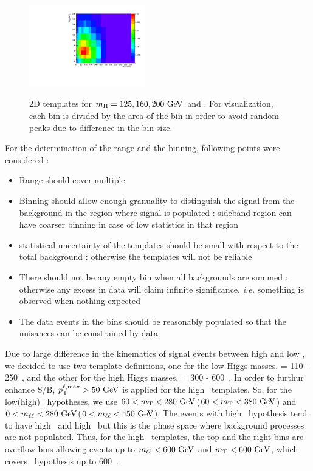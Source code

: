 \begin{figure}[htp]
{\centering
\label{subfig:2dNormBin_qqWW}
\includegraphics[width=0.45\textwidth]{figures/2dNormBin_qqWW.pdf}
}
\caption{ 2D templates for $m_{\mathrm{H}}=125, 160, 200~\mathrm{Ge\kern -0.1em V}$ and \qqww. 
For visualization, each bin is divided by 
the area of the bin in order to avoid random peaks due to difference in the bin size.  
}
\label{fig:2dNormBin}
\end{figure}


For the determination of the range and the binning, following points were considered : 
\begin{itemize}
\item Range should cover multiple \mHi
\item Binning should allow enough granuality to distinguish the signal from the background 
      in the region where signal is populated : sideband region can have coarser binning 
      in case of low statistics in that region
\item statistical uncertainty of the templates should be small with respect to the 
      total background : otherwise the templates will not be reliable  
\item There should not be any empty bin when all backgrounds are summed : otherwise any excess 
      in data will claim infinite significance, \textit{i.e.} something is observed when nothing 
      expected
\item The data events in the bins should be reasonably populated so that the nuisances 
      can be constrained by data
\end{itemize}

Due to large difference in the kinematics of signal events between high and low \mHi, 
we decided to use two template definitions, one for the low Higgs masses, 
\mHi = 110 - 250~\GeV, and the other for the high Higgs masses, \mHi = 300 - 600~\GeV. 
In order to furthur enhance S/B, $p_{\mathrm{T}}^{\ell,\mathrm{max}}>50~\mathrm{Ge\kern -0.1em V}$ is applied for the 
high \mHi\ templates. 
So, for the low(high) \mHi\ hypotheses, we use 
$60 < m_{\mathrm{T}} < 280~\mathrm{Ge\kern -0.1em V}$($60 < m_{\mathrm{T}} < 380~\mathrm{Ge\kern -0.1em V}$)
and 
$0 < m_{\ell\ell} < 280~\mathrm{Ge\kern -0.1em V}$($0 < m_{\ell\ell} < 450~\mathrm{Ge\kern -0.1em V}$).
The events with high \mHi\ hypothesis tend to have high \mT\ and high \mll\, 
but this is the phase space where background processes are not populated. 
Thus, for the high \mHi\ templates, the top and the right bins are overflow bins 
allowing events up to $m_{\ell\ell}<600~\mathrm{Ge\kern -0.1em V}$ and $m_{\mathrm{T}}<600~\mathrm{Ge\kern -0.1em V}$, 
which covers \mHi\ hypothesis up to 600~\GeV.

